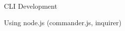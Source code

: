 \begin{cventries}
	\cventry
	{} %
	{CLI Development} %
	{} %
	{} %
	{
		\begin{cvitems} %
			\item {Using node.js (commander.js, inquirer)}
		\end{cvitems}
	}

\end{cventries}
